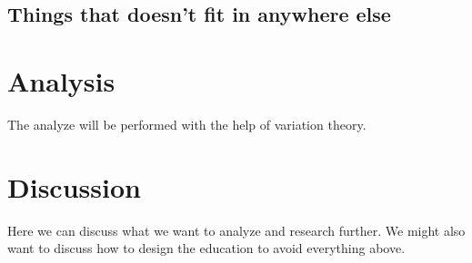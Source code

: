 \documentclass[twocolumn]{article}
\begin{document}







\subsection{Things that doesn't fit in anywhere else}




\section{Analysis}

The analyze will be performed with the help of variation theory. 

\section{Discussion}

Here we can discuss what we want to analyze and research further. We might also want to discuss how to design the education to avoid everything above.

\newpage
\end{document}
